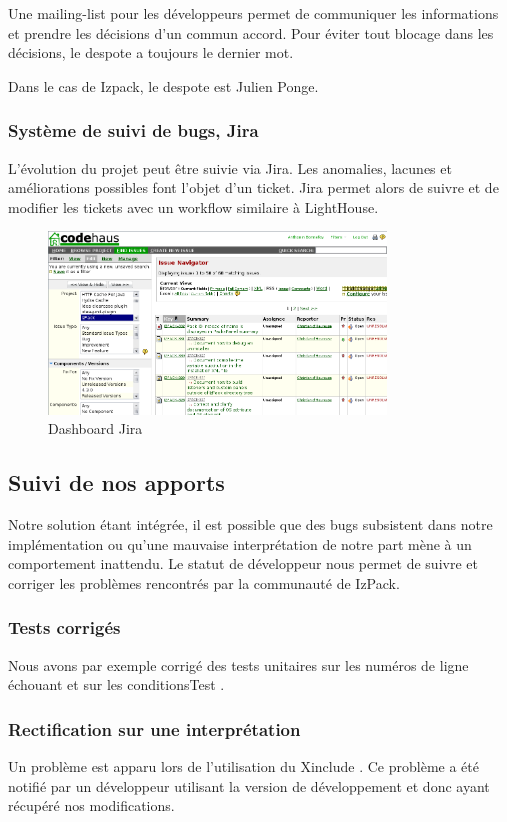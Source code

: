 Une mailing-list pour les développeurs permet de communiquer les informations et prendre les décisions d'un commun accord.
Pour éviter tout blocage dans les décisions, le despote a toujours le dernier mot.

Dans le cas de Izpack, le despote est Julien Ponge.

\subsubsection{Système de suivi de bugs, Jira}
L'évolution du projet peut être suivie via Jira.
Les anomalies, lacunes et améliorations possibles font l'objet d'un ticket.
Jira permet alors de suivre et de modifier les tickets avec un workflow similaire à LightHouse.
\begin{figure}[H]
	\centering
	\includegraphics[width=0.8\textwidth]{../image/jira.png}
	\caption{Dashboard Jira}
\end{figure}

\subsection{Suivi de nos apports}
Notre solution étant intégrée, il est possible que des bugs subsistent dans notre implémentation ou qu'une mauvaise interprétation de notre part mène à un comportement inattendu.
Le statut de développeur nous permet de suivre et corriger les problèmes rencontrés par la communauté de IzPack.

\subsubsection{Tests corrigés}
Nous avons par exemple corrigé des tests unitaires sur les numéros de ligne échouant \cite{IZPACK-306} et sur les conditionsTest \cite{IZPACK-305}.
\subsubsection{Rectification sur une interprétation}
Un problème est apparu lors de l'utilisation du Xinclude \cite{IZPACK-303}.
Ce problème a été notifié par un développeur utilisant la version de développement et donc ayant récupéré nos modifications.

